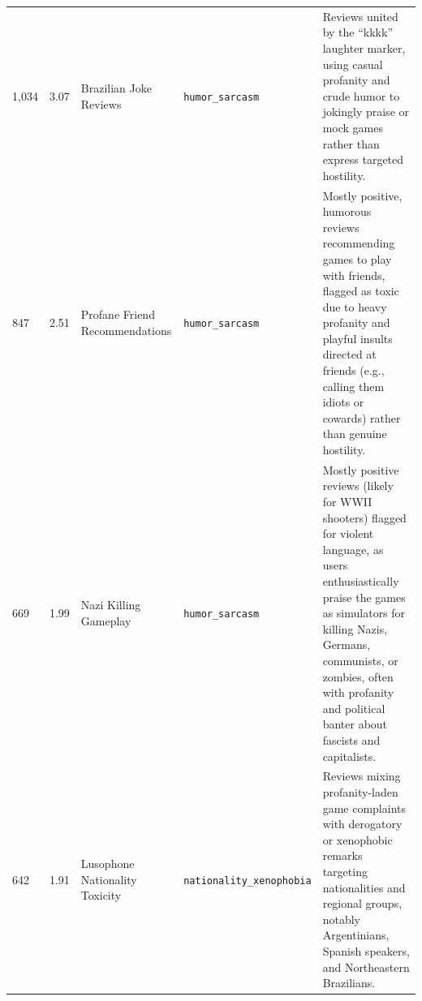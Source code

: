 {\begin{longtable}{p{0.9cm}p{0.6cm}p{3cm}lp{6.1cm}}
    1{,}034 & 3.07 & Brazilian Joke Reviews & \texttt{humor\_\allowbreak sarcasm} & Reviews united by the ``kkkk'' laughter marker, using casual profanity and crude humor to jokingly praise or mock games rather than express targeted hostility. \\
    847 & 2.51 & Profane Friend Recommendations & \texttt{humor\_\allowbreak sarcasm} & Mostly positive, humorous reviews recommending games to play with friends, flagged as toxic due to heavy profanity and playful insults directed at friends (e.g., calling them idiots or cowards) rather than genuine hostility. \\
    669 & 1.99 & Nazi Killing Gameplay & \texttt{humor\_\allowbreak sarcasm} & Mostly positive reviews (likely for WWII shooters) flagged for violent language, as users enthusiastically praise the games as simulators for killing Nazis, Germans, communists, or zombies, often with profanity and political banter about fascists and capitalists. \\
    642 & 1.91 & Lusophone Nationality Toxicity & \texttt{nationality\_\allowbreak xenophobia} & Reviews mixing profanity-laden game complaints with derogatory or xenophobic remarks targeting nationalities and regional groups, notably Argentinians, Spanish speakers, and Northeastern Brazilians. \\
\end{longtable}
}
